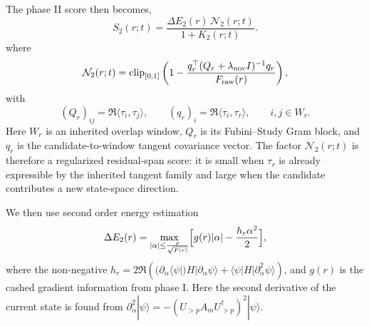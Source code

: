 \documentclass[
  reprint,
  amsmath,
  amssymb,
  aps,
  pra,
  nofootinbib,
  superscriptaddress,
  floatfix
]{revtex4-2}
\begin{document}
The phase II score then becomes,
\begin{equation}
S_2(r;t)=\frac{\Delta E_{2}(r)\,\mathcal N_2(r;t)}{1+K_2(r;t)}.
\label{eq:phase2_score}
\end{equation}
where
\begin{equation*}
\mathcal N_2(r;t)
=
\operatorname{clip}_{[0,1]}
\left(
1-
\frac{
q_r^{\top}(Q_r+\lambda_{\rm nov}I)^{-1}q_r
}{
F_{\rm raw}(r)
}
\right),
\end{equation*}
with
\begin{equation*}
(Q_r)_{ij}=\Re\langle\tau_i,\tau_j\rangle,
\qquad
(q_r)_i=\Re\langle\tau_i,\tau_r\rangle,
\qquad
i,j\in W_r.
\end{equation*}
Here $W_r$ is an inherited overlap window, $Q_r$ is its Fubini--Study Gram block, and $q_r$ is the candidate-to-window tangent covariance vector.  The factor $\mathcal N_2(r;t)$ is therefore a regularized residual-span score: it is small when $\tau_r$ is already expressible by the inherited tangent family and large when the candidate contributes a new state-space direction.

We then use second order energy estimation
\begin{equation*}
\Delta E_{2}(r)
=\max_{|\alpha|\le \frac{ \rho}{\sqrt{F(r)}}}
\Bigl[g(r)|\alpha| -\frac{h_r\alpha^2}{2}\Bigr],
\end{equation*}
where the non-negative $h_r=2\Re\!\left( ( \partial_{\alpha}\langle \psi|)H|\partial_{\alpha}\psi\rangle+\langle\psi|H|\partial^2_{\alpha}\psi\rangle\right)$, and $g(r)$ is the cashed gradient information from phase I. Here the second derivative of the current state is found from $\partial^2_{\alpha}|\psi \rangle=-(U_{>p}A_mU_{>p}^{\dagger})^2|\psi\rangle$.
\end{document}
